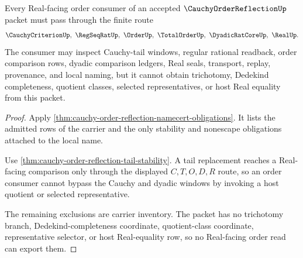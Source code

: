 \begin{theorem}
\label{thm:cauchy-order-reflection-nonescape}
Every Real-facing order consumer of an accepted $\CauchyOrderReflectionUp$ packet must pass through the finite route
$$
\CauchyCriterionUp,\ \RegSeqRatUp,\ \OrderUp,\ \TotalOrderUp,\ \DyadicRatCoreUp,\ \RealUp .
$$
The consumer may inspect Cauchy-tail windows, regular rational readback, order comparison rows, dyadic comparison ledgers, Real seals, transport, replay, provenance, and local naming, but it cannot obtain trichotomy, Dedekind completeness, quotient classes, selected representatives, or host Real equality from this packet.
\end{theorem}
\begin{proof}
Apply \autoref{thm:cauchy-order-reflection-namecert-obligations}. It lists the admitted rows of the carrier and the only stability and nonescape obligations attached to the local name.

Use \autoref{thm:cauchy-order-reflection-tail-stability}. A tail replacement reaches a Real-facing comparison only through the displayed $C,T,O,D,R$ route, so an order consumer cannot bypass the Cauchy and dyadic windows by invoking a host quotient or selected representative.

The remaining exclusions are carrier inventory. The packet has no trichotomy branch, Dedekind-completeness coordinate, quotient-class coordinate, representative selector, or host Real-equality row, so no Real-facing order read can export them.
\end{proof}


\begin{closurestatus}{\CauchyOrderReflectionUp}
  \theoryclosure{\seedClosure}
  \formalstatus{\unformalizedV}
\end{closurestatus}
